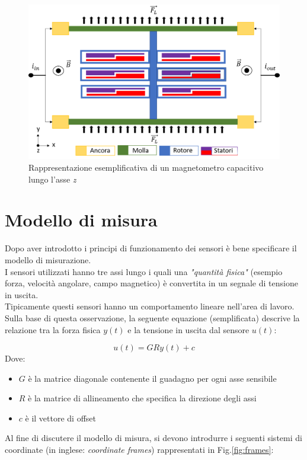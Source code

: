  \begin{figure}[H]  
	\centering 
	\includegraphics[scale=0.4 ]{tecnologie/magnet.png}
	\caption{Rappresentazione esemplificativa di un magnetometro capacitivo lungo l'asse \textit{z}}
	\label{fig:magnet}
\end{figure}


\section{Modello di misura}
\label{modello_di_misura}
Dopo aver introdotto i principi di funzionamento dei sensori è bene specificare il modello di misurazione.\\
I sensori utilizzati hanno tre assi lungo i quali una \textit{"quantità fisica"} (esempio forza, velocità angolare, campo magnetico) è convertita in un segnale di tensione in uscita. \\
Tipicamente questi sensori hanno un comportamento lineare nell'area di lavoro. Sulla base di questa osservazione, la seguente equazione (semplificata) descrive la relazione tra la forza fisica $y(t)$ e la tensione in uscita dal sensore $ u(t)$:

\begin{equation}
    u(t) = G R y(t) + c
\end{equation}
Dove:
\begin{itemize}
	\item $G$ è la matrice diagonale contenente il guadagno per ogni asse sensibile
	\item $R$ è la matrice di allineamento che specifica la direzione degli assi
	\item $c$ è il vettore di offset 
\end{itemize}
Al fine di discutere il modello di misura, si devono introdurre i seguenti sistemi di coordinate (in inglese: \textit{coordinate frames}) rappresentati in Fig.\ref{fig:frames}:

